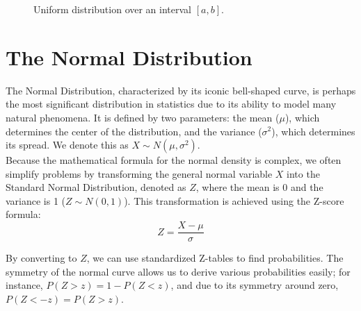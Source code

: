 \documentclass[12pt]{scrartcl}
\begin{document}
\begin{figure}[H]
	\centering
	\caption{Uniform distribution over an interval $[a, b]$.}
\end{figure}

\section{The Normal Distribution}

The Normal Distribution, characterized by its iconic bell-shaped curve, is perhaps the most significant distribution in statistics due to its ability to model many natural phenomena. It is defined by two parameters: the mean ($\mu$), which determines the center of the distribution, and the variance ($\sigma^2$), which determines its spread. We denote this as $X \sim N(\mu, \sigma^2)$. \\

Because the mathematical formula for the normal density is complex, we often simplify problems by transforming the general normal variable $X$ into the Standard Normal Distribution, denoted as $Z$, where the mean is 0 and the variance is 1 ($Z \sim N(0, 1)$). This transformation is achieved using the Z-score formula:
\begin{equation}
	Z = \frac{X - \mu}{\sigma}
\end{equation}

By converting to $Z$, we can use standardized Z-tables to find probabilities. The symmetry of the normal curve allows us to derive various probabilities easily; for instance, $P(Z > z) = 1 - P(Z < z)$, and due to its symmetry around zero, $P(Z < -z) = P(Z > z)$.
\end{document}
